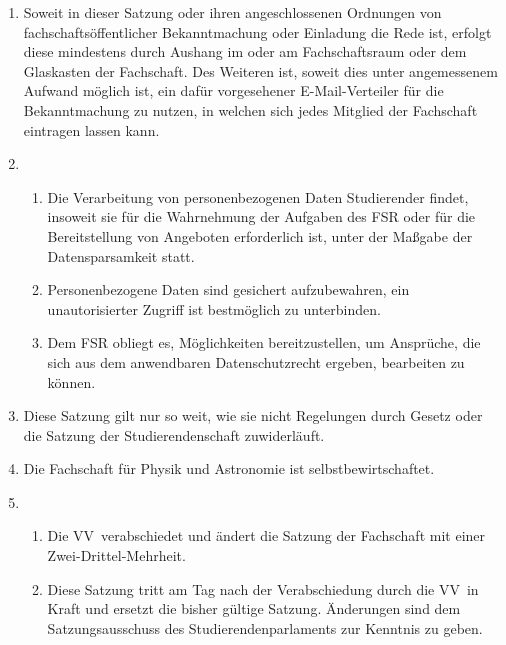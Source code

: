 \documentclass[a4paper, 12pt]{article}
\newcommand{\vv}{VV}
\begin{document}
\begin{enumerate}[leftmargin=0cm]
	
	\item {}
	
	Soweit in dieser Satzung oder ihren angeschlossenen Ordnungen von fachschaftsöffentlicher Bekanntmachung oder Einladung die Rede ist, erfolgt diese mindestens durch Aushang im oder am Fachschaftsraum oder dem Glaskasten der Fachschaft. Des Weiteren ist, soweit dies unter angemessenem Aufwand möglich ist, ein dafür vorgesehener E-Mail-Verteiler für die Bekanntmachung zu nutzen, in welchen sich jedes Mitglied der Fachschaft eintragen lassen kann.
	
	\item {}
	
	\begin{enumerate}[leftmargin=0cm]
		\item Die Verarbeitung von personenbezogenen Daten Studierender findet, insoweit
		sie für die Wahrnehmung der Aufgaben des FSR oder für die Bereitstellung von Angeboten erforderlich ist, unter der Maßgabe der Datensparsamkeit statt.
		\item Personenbezogene Daten sind gesichert aufzubewahren, ein unautorisierter Zugriff ist bestmöglich zu unterbinden.
		\item Dem FSR obliegt es, Möglichkeiten bereitzustellen, um Ansprüche, die sich aus dem anwendbaren Datenschutzrecht ergeben, bearbeiten zu können.
	\end{enumerate}
	
	\item {}
	
	Diese Satzung gilt nur so weit, wie sie nicht Regelungen durch Gesetz oder die Satzung der Studierendenschaft zuwiderläuft.
	
	\item {}
	
	Die Fachschaft für Physik und Astronomie ist selbstbewirtschaftet.
	
	\item {}
	\begin{enumerate}[leftmargin=0cm]
		\item Die \vv~verabschiedet und ändert die Satzung der Fachschaft mit einer Zwei-Drittel-Mehrheit.
		\item Diese Satzung tritt am Tag nach der Verabschiedung durch die \vv~in
		Kraft und ersetzt die bisher gültige Satzung. Änderungen sind dem Satzungsausschuss des Studierendenparlaments zur Kenntnis zu geben.
	\end{enumerate}
	
	\end{enumerate}
\end{document}
